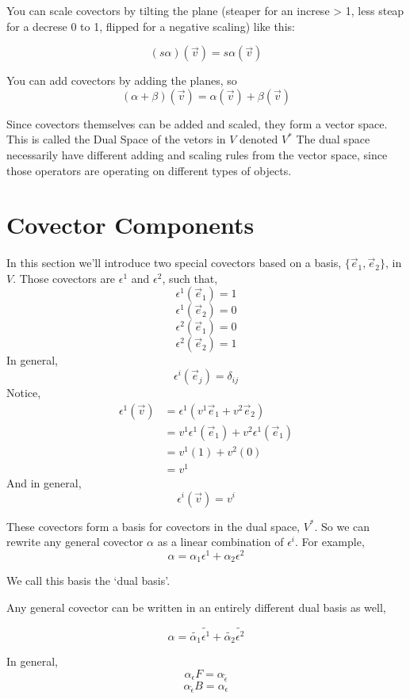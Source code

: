\documentclass[12pt]{book}
\theoremstyle{plain}
\theoremstyle{definition}
\theoremstyle{ppart}
\theoremstyle{case}
\theoremstyle{solution}
\begin{document}
You can scale covectors by tilting the plane (steaper for an increse > 1, less steap for a decrese 0 to 1, flipped for a negative scaling)
like this:

\[ (s \alpha)(\vec{v}) = s \alpha(\vec{v}) \]

You can add covectors by adding the planes, so
\[ (\alpha+\beta)(\vec{v}) = \alpha(\vec{v})+\beta(\vec{v}) \]

Since covectors themselves can be added and scaled, they form a vector space. This is called the Dual Space of the vetors in $V$ denoted $V^*$
The dual space necessarily have different adding and scaling rules from the vector space, since those operators are operating on different
types of objects.

\section{Covector Components}

In this section \cite{youtube:tensor5} we'll introduce two special covectors based on a basis, $\{\vec{e}_1, \vec{e}_2\}$, in $V$.
Those covectors are $\epsilon^1$ and $\epsilon^2$, such that,
\[ \epsilon^1(\vec{e}_1) = 1 \]
\[ \epsilon^1(\vec{e}_2) = 0 \]
\[ \epsilon^2(\vec{e}_1) = 0 \]
\[ \epsilon^2(\vec{e}_2) = 1 \]
In general,
\[ \epsilon^i(\vec{e}_j) = \delta_{ij} \]
Notice,
\begin{align*}
  \epsilon^1(\vec{v})
  &= \epsilon^1(v^1 \vec{e}_1 + v^2 \vec{e}_2) \\
  &= v^1 \epsilon^1(\vec{e}_1) + v^2 \epsilon^1(\vec{e}_1) \\
  &= v^1 (1) + v^2 (0) \\
  &= v^1
\end{align*}
And in general,
\[ \epsilon^i(\vec{v}) = v^i \]

These covectors form a basis for covectors in the dual space, $V^*$.
So we can rewrite any general covector $\alpha$ as a linear combination of $\epsilon^i$.
For example,
\[ \alpha = \alpha_1\epsilon^1 + \alpha_2 \epsilon^2 \]

We call this basis the `dual basis'.

Any general covector can be written in an entirely different dual basis as well,

\[ \alpha = \widetilde{\alpha_1} \widetilde{\epsilon^1} +  \widetilde{\alpha_2} \widetilde{\epsilon^2} \]

In general,
\[ \alpha_{\epsilon} F = \alpha_{\widetilde{\epsilon}} \]
\[ \alpha_{\widetilde{\epsilon}} B = \alpha_{\epsilon} \]
\end{document}
